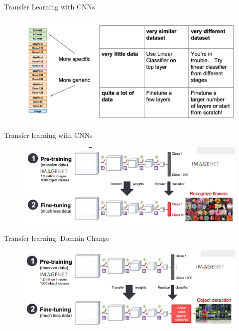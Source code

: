 \documentclass[serif, aspectratio=169]{beamer}
\begin{document}
\begin{frame}{Transfer Learning with CNNs}
	\begin{figure}[htpb]
		\begin{center}
			\includegraphics[keepaspectratio, scale=0.25]{pic/TL_cnn3}
		\end{center}
	\end{figure}
\end{frame}

\begin{frame}{Transfer learning with CNNs}
	\begin{figure}[htpb]
		\begin{center}
			\includegraphics[keepaspectratio, scale=0.25]{pic/TL_idea}
		\end{center}
	\end{figure}
\end{frame}

\begin{frame}{Transfer learning: Domain Change}
	\begin{figure}[htpb]
		\begin{center}
			\includegraphics[keepaspectratio, scale=0.25]{pic/TL_domain_change}
		\end{center}
	\end{figure}
\end{frame}
\end{document}
